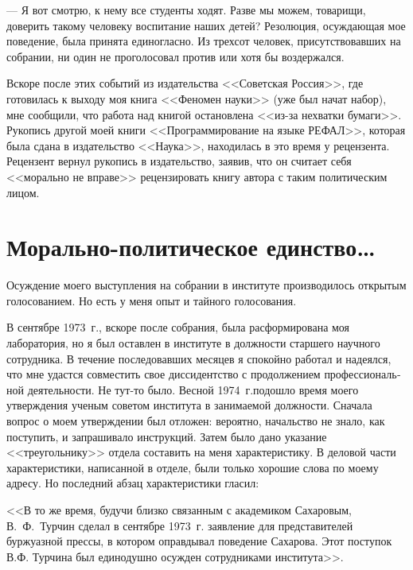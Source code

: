 \documentclass{book}
\begin{document}
--- Я вот смотрю, к нему все студенты ходят. Разве мы можем, товарищи, доверить такому человеку воспитание наших детей?
Резолюция, осуждающая мое поведение, была принята единогласно. Из трехсот человек, присутствовавших на собрании, ни один не проголосовал против или хотя бы воздержался.

Вскоре после этих событий из издательства <<Советская Россия>>, где готовилась к выходу моя книга <<Феномен науки>> (уже был начат набор), мне сообщили, что работа над книгой остановлена <<из-за нехватки бумаги>>. Рукопись другой моей книги <<Программирование на языке РЕФАЛ>>, которая была сдана в издательство <<Наука>>, находилась в это время у рецензента. Рецензент вернул рукопись в издательство, заявив, что он считает себя <<морально не вправе>> рецензировать книгу автора с таким политическим лицом.


\section{Морально-политическое единство\ldots}


Осуждение моего выступления на собрании в институте производилось открытым голосованием. Но есть у меня опыт и тайного голосования.

В сентябре 1973~г., вскоре после собрания, была расформиро­вана моя лаборатория, но я был оставлен в институте в долж­ности старшего научного сотрудника. В течение последовавших месяцев я спокойно работал и надеялся, что мне удастся совместить свое диссидентство с продолжением профессиональ­ной деятельности. Не тут-то было. Весной 1974~г.подошло время моего утверждения ученым советом института в занима­емой должности. Сначала вопрос о моем утверждении был от­ложен: вероятно, начальство не знало, как поступить, и запра­шивало инструкций. Затем было дано указание <<треугольнику>> отдела составить на меня характеристику.
В деловой части характеристики, написанной в отделе, были только хорошие слова по моему адресу. Но последний абзац характеристики гласил:

<<В то же время, будучи близко связанным с академиком Сахаровым, В.~Ф.~Турчин сделал в сентябре 1973~г. заявление для представителей буржуазной прессы, в котором оправды­вал поведение Сахарова. Этот поступок В.Ф. Турчина был еди­нодушно осужден сотрудниками института>>.
\end{document}
